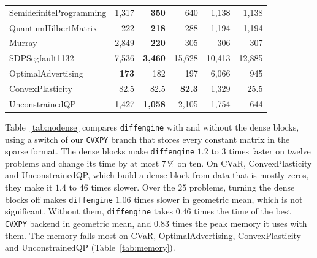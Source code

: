 \begin{table}[htbp]
{\begin{tabular}{l rrrrr}
SemidefiniteProgramming & 1{,}317 & \textbf{350} & 640 & 1{,}138 & 1{,}138 \\
QuantumHilbertMatrix & 222 & \textbf{218} & 288 & 1{,}194 & 1{,}194 \\
Murray & 2{,}849 & \textbf{220} & 305 & 306 & 307 \\
SDPSegfault1132 & 7{,}536 & \textbf{3{,}460} & 15{,}628 & 10{,}413 & 12{,}885 \\
OptimalAdvertising & \textbf{173} & 182 & 197 & 6{,}066 & 945 \\
ConvexPlasticity & 82.5 & 82.5 & \textbf{82.3} & 1{,}329 & 25.5 \\
UnconstrainedQP & 1{,}427 & \textbf{1{,}058} & 2{,}105 & 1{,}754 & 644 \\
\bottomrule
\end{tabular}}
\end{table}

\FloatBarrier

Table~\ref{tab:nodense}\label{sec:bench-ablation} compares \texttt{diffengine} with and
without the dense blocks, using a switch of our \texttt{CVXPY} branch that stores every constant
matrix in the sparse format. The dense blocks make \texttt{diffengine} $1.2$ to $3$ times faster
on twelve problems and change its time by at most $7\,\%$ on ten. On CVaR, ConvexPlasticity
and UnconstrainedQP, which build a dense block from data that is mostly zeros, they make it
$1.4$ to $46$ times slower. Over the $25$ problems, turning the dense blocks off makes
\texttt{diffengine} $1.06$ times slower in geometric mean, which is not significant. Without them,
\texttt{diffengine} takes $0.46$ times the time of the best \texttt{CVXPY} backend in geometric
mean, and $0.83$ times the peak memory it uses with them. The memory falls most on CVaR,
OptimalAdvertising, ConvexPlasticity and UnconstrainedQP (Table~\ref{tab:memory}).

